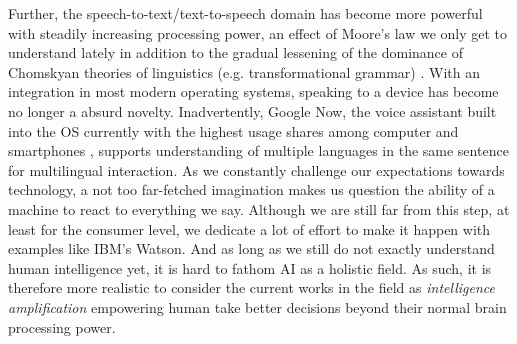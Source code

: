 Further, the speech-to-text/text-to-speech domain has become more powerful with steadily increasing processing power, an effect of Moore's law we only get to understand lately in addition to the gradual lessening of the dominance of Chomskyan theories of linguistics (e.g. transformational grammar) \cite{wiki:nlp}.
With an integration in most modern operating systems, speaking to a device has become no longer a absurd novelty. Inadvertently, Google Now, the voice assistant built into the OS currently with the highest usage shares among computer and smartphones \cite{wiki:gartnerreports}, supports understanding of multiple languages in the same sentence for multilingual interaction.
As we constantly challenge our expectations towards technology, a not too far-fetched imagination makes us question the ability of a machine to react to everything we say.
Although we are still far from this step, at least for the consumer level, we dedicate a lot of effort to make it happen with examples like IBM's Watson.
And as long as we still do not exactly understand human intelligence yet, it is hard to fathom AI as a holistic field. As such, it is therefore more realistic to consider the current works in the field as \textit{intelligence amplification} \cite{alexapc18} empowering human take better decisions beyond their normal brain processing power.
\\




 


